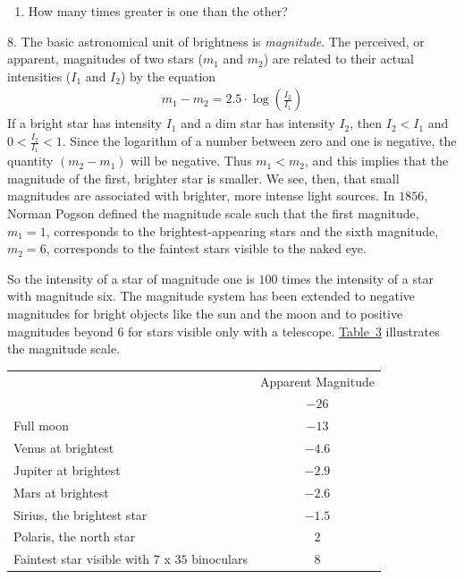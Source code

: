 \documentclass[10pt,]{book}
\theoremstyle{plain}
\theoremstyle{definition}
\theoremstyle{definition}
\theoremstyle{definition}
\numberwithin{equation}{section}
\newcommand{\hrulemedium}{\noalign{\hrule height 0.07em}}
\newcommand{\hrulethick} {\noalign{\hrule height 0.11em}}
\newcommand{\lt}{<}
\begin{document}
\begin{exerciselist}
\begin{enumerate}[label=(\alph*)]
\item\hypertarget{li-234}{}How many times greater is one than the other?%
\end{enumerate}
%
\par\smallskip
\item[8.]\hypertarget{exercise-90}{}\hypertarget{p-320}{}%
The basic astronomical unit of brightness is \emph{magnitude}.  The perceived, or apparent, magnitudes of two stars (\(m_1\) and \(m_2\)) are related to their actual intensities (\(I_1\) and \(I_2\)) by the equation%
\begin{gather*}
m_1 - m_2 = 2.5 \cdot \log \left( \frac{I_2}{I_1} \right)
\end{gather*}
If a bright star has intensity \(I_1\) and a dim star has intensity \(I_2\), then \(I_2 \lt I_1\) and \(0 \lt \frac{I_2}{I_1} \lt 1\). Since the logarithm of a number between zero and one is negative, the quantity \(\left( m_2 - m_1 \right)\) will be negative. Thus \(m_1 \lt m_2\), and this implies that the magnitude of the first, brighter star is smaller. We see, 	then, that small magnitudes are associated with brighter, more intense light sources. In \(1856\), Norman Pogson defined the magnitude scale such that the first magnitude, \(m_1 = 1\), corresponds to the brightest-appearing stars and the sixth magnitude, \(m_2 = 6\), corresponds to the faintest stars visible to the naked eye.%
\par
\hypertarget{p-321}{}%
So the intensity of a star of magnitude one is \(100\) times the intensity of a star with magnitude six. The magnitude system has been extended to negative magnitudes for bright objects like the sun and the moon and to positive magnitudes beyond \(6\) for stars visible only with a telescope.  \hyperref[star-chart]{Table~3} illustrates the magnitude scale.%
\begin{table}
\centering
\begin{tabular}{cc}\hrulethick
\multicolumn{1}{l}{Object}&Apparent Magnitude\tabularnewline\hrulemedium
\multicolumn{1}{l}{Sun}&\(-26\)\tabularnewline[0pt]
\multicolumn{1}{l}{Full moon}&\(-13\)\tabularnewline[0pt]
\multicolumn{1}{l}{Venus at brightest}&\(-4.6\)\tabularnewline[0pt]
\multicolumn{1}{l}{Jupiter at brightest}&\(-2.9\)\tabularnewline[0pt]
\multicolumn{1}{l}{Mars at brightest}&\(-2.6\)\tabularnewline[0pt]
\multicolumn{1}{l}{Sirius, the brightest star}&\(-1.5\)\tabularnewline[0pt]
\multicolumn{1}{l}{Polaris, the north star}&\(2\)\tabularnewline[0pt]
\multicolumn{1}{l}{Faintest star visible with \(7\) x \(35\) binoculars}&\(8\)\tabularnewline[0pt]

\end{tabular}
\end{table}
\end{exerciselist}
\end{document}
